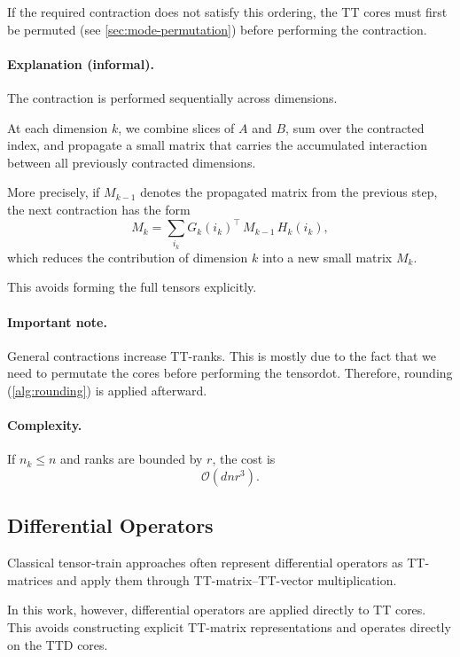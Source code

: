 \documentclass[11pt,a4paper,parskip=half-]{scrartcl}
\theoremstyle{definition}
\theoremstyle{plain}
\theoremstyle{remark}
\begin{document}
If the required contraction does not satisfy this ordering,
the TT cores must first be permuted (see \cref{sec:mode-permutation})
before performing the contraction.

\paragraph{Explanation (informal).}

The contraction is performed sequentially across dimensions.

At each dimension $k$, we combine slices of $A$ and $B$,
sum over the contracted index, and propagate a small matrix
that carries the accumulated interaction between all previously
contracted dimensions.

More precisely, if $M_{k-1}$ denotes the propagated matrix from
the previous step, the next contraction has the form
\[
M_k
=
\sum_{i_k}
G_k(i_k)^\top
\, M_{k-1} \,
H_k(i_k),
\]
which reduces the contribution of dimension $k$ into a new
small matrix $M_k$.

This avoids forming the full tensors explicitly.

\paragraph{Important note.}

General contractions increase TT-ranks. This is mostly due to the fact that we need to permutate the cores before performing the tensordot.
Therefore, rounding (\cref{alg:rounding}) is applied afterward.

\paragraph{Complexity.}

If $n_k \le n$ and ranks are bounded by $r$, the cost is
\[
\mathcal{O}(d n r^3).
\]

\subsection{Differential Operators}
\label{sec:differential_operators}

Classical tensor-train approaches often represent differential
operators as TT-matrices and apply them through TT-matrix--TT-vector
multiplication.

In this work, however, differential operators are applied directly
to TT cores. This avoids constructing explicit TT-matrix
representations and operates directly on the TTD cores.
\end{document}
